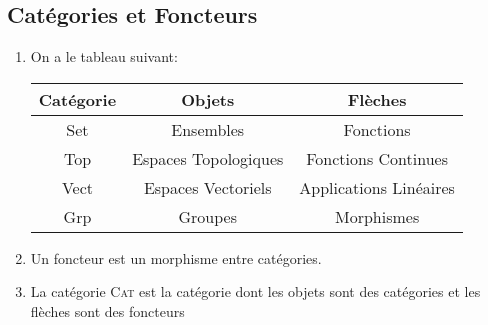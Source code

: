 \documentclass[math]{cours}
\begin{document}
\subsection{Catégories et Foncteurs}
\begin{enumerate}
	\item On a le tableau suivant:
		\begin{tabular}{>{\sc}ccc}
			\bf Catégorie & \bf Objets &\bf Flèches\\
			\midrule
			Set & Ensembles & Fonctions\\
			Top & Espaces Topologiques & Fonctions Continues\\
			Vect & Espaces Vectoriels & Applications Linéaires\\
			Grp & Groupes & Morphismes
		\end{tabular}
	\item Un foncteur est un morphisme entre catégories.
	\item La catégorie \textsc{Cat} est la catégorie dont les objets sont des catégories et les flèches sont des foncteurs
\end{enumerate}
\end{document}
